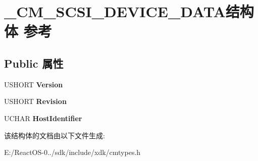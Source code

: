 \hypertarget{struct___c_m___s_c_s_i___d_e_v_i_c_e___d_a_t_a}{}\section{\+\_\+\+C\+M\+\_\+\+S\+C\+S\+I\+\_\+\+D\+E\+V\+I\+C\+E\+\_\+\+D\+A\+T\+A结构体 参考}
\label{struct___c_m___s_c_s_i___d_e_v_i_c_e___d_a_t_a}
\subsection*{Public 属性}
\begin{DoxyCompactItemize}
\item 
\mbox{\label{struct___c_m___s_c_s_i___d_e_v_i_c_e___d_a_t_a_aa47c44ca9d5137d67ab7b3e028e5e30a}} 
U\+S\+H\+O\+RT {\bfseries Version}
\item 
\mbox{\label{struct___c_m___s_c_s_i___d_e_v_i_c_e___d_a_t_a_ae2bc788f5e8ccfb4651653490667e97b}} 
U\+S\+H\+O\+RT {\bfseries Revision}
\item 
\mbox{\label{struct___c_m___s_c_s_i___d_e_v_i_c_e___d_a_t_a_a8564566d25cb679bf5058ebc016197e3}} 
U\+C\+H\+AR {\bfseries Host\+Identifier}
\end{DoxyCompactItemize}


该结构体的文档由以下文件生成\+:\begin{DoxyCompactItemize}
\item 
E\+:/\+React\+O\+S-\/0../sdk/include/xdk/cmtypes.\+h\end{DoxyCompactItemize}
